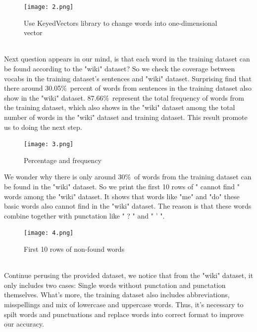 \documentclass{article}
\begin{document}
\begin{figure}[h]
	\centering
	\texttt{[image: 2.png]}
	\caption{Use KeyedVectors library to change words into one-dimensional vector}
\end{figure}\\
\noindent Next question appears in our mind, is that each word in the training dataset can be found according to the "wiki" dataset? So we check the coverage between vocabs in the training dataset's sentences and "wiki" dataset. Surprising find that there around 30.05\%\ percent of words from sentences in the training dataset also show in the "wiki" dataset. 87.66\%\ represent the total frequency of words from the training dataset, which also shows in the "wiki" dataset among the total number of words in the "wiki" dataset and training dataset. This result promote us to doing the next step.\\
\begin{figure}[H]
	\centering
	\texttt{[image: 3.png]}
	\caption{Percentage and frequency}
\end{figure}
\noindent We wonder why there is only around 30\%\  of words from the training dataset can be found in the "wiki" dataset. So we print the first 10 rows of " cannot find " words among the "wiki" dataset. It shows that words like "me" and "do" these basic words also cannot find in the "wiki" dataset. The reason is that these words combine together with punctation like " ? " and " ' ". \\
\begin{figure}[h]
	\centering
	\texttt{[image: 4.png]}
	\caption{First 10 rows of non-found words}
\end{figure}\\
\noindent Continue perusing the provided dataset, we notice that from the "wiki" dataset, it only includes two cases: Single words without punctation and punctation themselves. What's more, the training dataset also includes abbreviations, misspellings and mix of lowercase and uppercase words. Thus, it's necessary to spilt words and punctuations and replace words into correct format to improve our accuracy.\\
\end{document}
